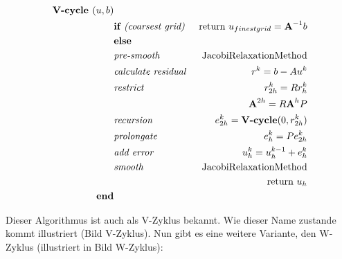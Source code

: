 \begin{eqnarray}
\textbf{V-cycle }(u,b)                         & \notag \\
&\textbf{if }\textit{(coarsest grid) }&\textnormal{return } u_{finest grid}={\textbf{A}}^{-1}b \notag \\
&\textbf{else }                                                & \notag \\
&\textit{pre-smooth }                                 &\textnormal{JacobiRelaxationMethod} \notag \\
&\textit{calculate residual }                &r^{k} = b - Au^{k} \notag \\
&\textit{restrict }                                 &r^{k}_{2h}=Rr^{k}_{h} \notag \\
&                                                                        &{\textbf{A}}^{2h} = R{\textbf{A}}^{h}P \notag \\
&\textit{recursion }                                &e^{k}_{2h} = \textbf{V-cycle}(0,r^{k}_{2h}) \notag \\
&\textit{prolongate }                                &e^{k}_{h} = Pe^{k}_{2h} \notag \\
&\textit{add error }                                &u^{k}_{h} = u^{k-1}_{h} + e^{k}_{h} \notag \\
&\textit{smooth }                                        &\textnormal{JacobiRelaxationMethod} \notag \\
&                                                                        &\textnormal{return } u_{h} \notag \\
\textbf{end}                                                & \notag
\end{eqnarray}

Dieser Algorithmus ist auch als V-Zyklus bekannt. Wie dieser Name zustande kommt illustriert (Bild V-Zyklus). Nun gibt es eine weitere Variante, den W-Zyklus (illustriert in Bild W-Zyklus):


